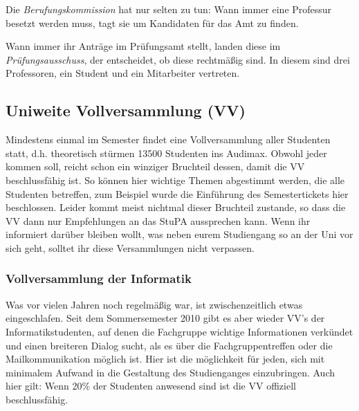 		Die \emph{Berufungskommission} hat nur selten zu tun: Wann immer eine Professur besetzt werden muss, tagt sie um Kandidaten für das Amt zu finden.

		Wann immer ihr Anträge im Prüfungsamt stellt, landen diese im \emph{Prüfungsausschuss}, der entscheidet, ob diese rechtmäßig sind. In diesem sind drei Professoren, ein Student und ein Mitarbeiter vertreten.

	\subsection*{Uniweite Vollversammlung (VV)}
		Mindestens einmal im Semester findet eine
		Vollversammlung aller Studenten statt, d.h. theoretisch
		stürmen 13500 Studenten ins Audimax. Obwohl jeder kommen
		soll, reicht schon ein winziger Bruchteil dessen, damit
		die VV beschlussfähig ist. So können hier wichtige
		Themen abgestimmt werden, die alle Studenten betreffen,
		zum Beispiel wurde die Einführung des Semestertickets
		hier beschlossen. Leider kommt meist nichtmal dieser
		Bruchteil zustande, so dass die VV dann nur Empfehlungen
		an das StuPA aussprechen kann. Wenn ihr informiert darüber 
		bleiben wollt, was neben eurem Studiengang so an der Uni vor sich geht, solltet ihr diese Versammlungen nicht verpassen.

		\subsubsection*{Vollversammlung der Informatik}
			Was vor vielen Jahren noch regelmäßig war, ist
			zwischenzeitlich etwas eingeschlafen. Seit dem
			Sommersemester 2010 gibt es aber wieder VV's der
			Informatikstudenten, auf denen die Fachgruppe
			wichtige Informationen verkündet und einen
			breiteren Dialog sucht, als es über die
			Fachgruppentreffen oder die Mailkommunikation
			möglich ist. Hier ist die möglichkeit für jeden,
			sich mit minimalem Aufwand in die Gestaltung des
			Studienganges einzubringen. Auch hier gilt: Wenn
			20\% der Studenten anwesend sind  ist die VV offiziell beschlussfähig.